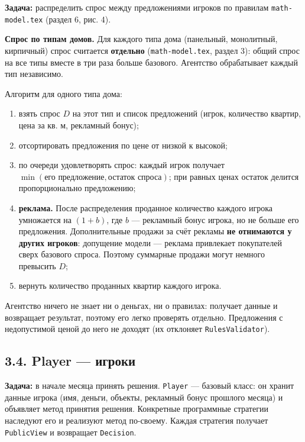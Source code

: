 \documentclass[
]{article}
\providecommand{\tightlist}{%
  \setlength{\itemsep}{0pt}\setlength{\parskip}{0pt}}
\begin{document}
\textbf{Задача:} распределить спрос между предложениями игроков по
правилам \texttt{math-model.tex} (раздел 6, рис. 4).

\textbf{Спрос по типам домов.} Для каждого типа дома (панельный,
монолитный, кирпичный) спрос считается \textbf{отдельно}
(\texttt{math-model.tex}, раздел 3): общий спрос на все типы вместе в три
раза больше базового. Агентство обрабатывает каждый тип независимо.

Алгоритм для одного типа дома:

\begin{enumerate}
\def\labelenumi{\arabic{enumi}.}
\tightlist
\item
  взять спрос \(D\) на этот тип и список предложений (игрок, количество
  квартир, цена за кв. м, рекламный бонус);
\item
  отсортировать предложения по цене от низкой к высокой;
\item
  по очереди удовлетворять спрос: каждый игрок получает
  \(\min(\text{его предложение}, \text{остаток спроса})\); при равных
  ценах остаток делится пропорционально предложению;
\item
  \textbf{реклама.} После распределения проданное количество каждого
  игрока умножается на \((1 + b)\), где \(b\) --- рекламный бонус
  игрока, но не больше его предложения. Дополнительные продажи за счёт
  рекламы \textbf{не отнимаются у других игроков}: допущение модели ---
  реклама привлекает покупателей сверх базового спроса. Поэтому
  суммарные продажи могут немного превысить \(D\);
\item
  вернуть количество проданных квартир каждого игрока.
\end{enumerate}

Агентство ничего не знает ни о деньгах, ни о правилах: получает данные и
возвращает результат, поэтому его легко проверять отдельно. Предложения
с недопустимой ценой до него не доходят (их отклоняет
\texttt{RulesValidator}).

\subsection{3.4. Player ---
игроки}\label{player-ux438ux433ux440ux43eux43aux438}

\textbf{Задача:} в начале месяца принять решения. \texttt{Player} ---
базовый класс: он хранит данные игрока (имя, деньги, объекты, рекламный
бонус прошлого месяца) и объявляет метод принятия решения. Конкретные
программные стратегии наследуют его и реализуют метод по-своему. Каждая
стратегия получает \texttt{PublicView} и возвращает \texttt{Decision}.
\end{document}
